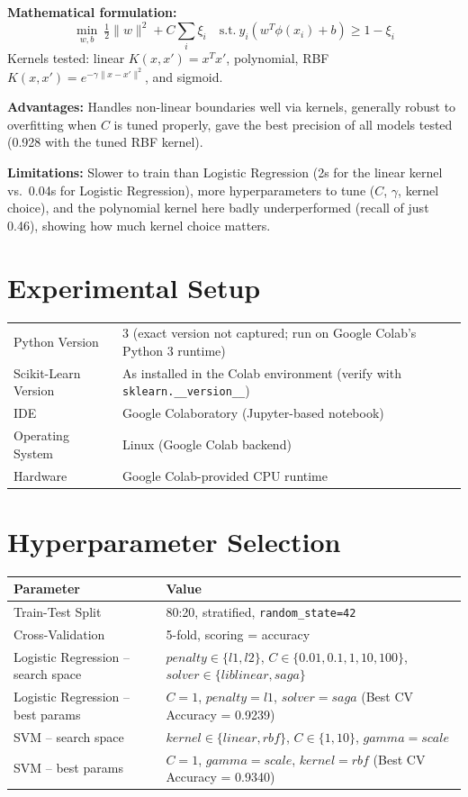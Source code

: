 \documentclass[12pt,a4paper]{article}
\begin{document}
\textbf{Mathematical formulation:}
\[
\min_{w,b}\ \tfrac{1}{2}\|w\|^2 + C\sum_i \xi_i \quad \text{s.t.}\ y_i(w^T\phi(x_i)+b) \ge 1-\xi_i
\]
Kernels tested: linear $K(x,x')=x^Tx'$, polynomial, RBF $K(x,x')=e^{-\gamma\|x-x'\|^2}$, and sigmoid.

\textbf{Advantages:} Handles non-linear boundaries well via kernels, generally robust to overfitting when $C$ is tuned properly, gave the best precision of all models tested (0.928 with the tuned RBF kernel).

\textbf{Limitations:} Slower to train than Logistic Regression (2s for the linear kernel vs.\ 0.04s for Logistic Regression), more hyperparameters to tune ($C$, $\gamma$, kernel choice), and the polynomial kernel here badly underperformed (recall of just 0.46), showing how much kernel choice matters.

\section{Experimental Setup}
\begin{tabular}{ll}
\toprule
Python Version & 3 (exact version not captured; run on Google Colab's Python 3 runtime)\\
Scikit-Learn Version & As installed in the Colab environment (verify with \texttt{sklearn.\_\_version\_\_})\\
IDE & Google Colaboratory (Jupyter-based notebook)\\
Operating System & Linux (Google Colab backend)\\
Hardware & Google Colab-provided CPU runtime\\
\bottomrule
\end{tabular}

\section{Hyperparameter Selection}
\begin{tabular}{ll}
\toprule
Parameter & Value\\
\midrule
Train-Test Split & 80:20, stratified, \texttt{random\_state=42}\\
Cross-Validation & 5-fold, scoring = accuracy\\
Logistic Regression -- search space & $penalty\in\{l1,l2\}$, $C\in\{0.01,0.1,1,10,100\}$, $solver\in\{liblinear,saga\}$\\
Logistic Regression -- best params & $C=1$, $penalty=l1$, $solver=saga$ (Best CV Accuracy = 0.9239)\\
SVM -- search space & $kernel\in\{linear,rbf\}$, $C\in\{1,10\}$, $gamma=scale$\\
SVM -- best params & $C=1$, $gamma=scale$, $kernel=rbf$ (Best CV Accuracy = 0.9340)\\
\bottomrule
\end{tabular}
\end{document}
